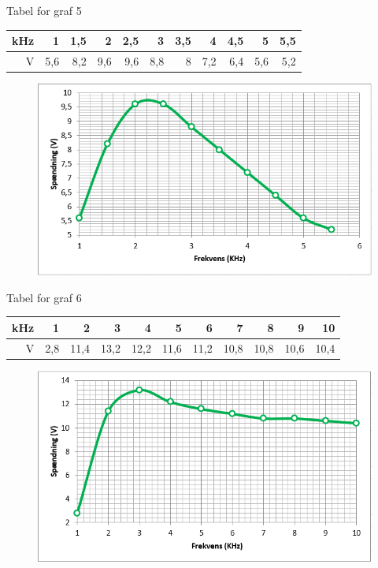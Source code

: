 Tabel for graf 5

\begin{tabular}{|r|r|r|r|r|r|r|r|r|r|r|} \hline
kHz & 1 & 1,5 & 2 & 2,5 & 3 & 3,5 & 4 & 4,5 & 5 & 5,5 \\ \hline
V & 5,6 & 8,2 & 9,6 & 9,6 & 8,8 & 8 & 7,2 & 6,4 & 5,6 & 5,2 \\ \hline
\end{tabular}

\begin{figure}[H]
\includegraphics[scale=1]{Graf5}
\end{figure}

Tabel for graf 6

\begin{tabular}{|r|r|r|r|r|r|r|r|r|r|r|} \hline
kHz & 1 & 2 & 3 & 4 & 5 & 6 & 7 & 8 & 9 & 10 \\ \hline
V & 2,8 & 11,4 & 13,2 & 12,2 & 11,6 & 11,2 & 10,8 & 10,8 & 10,6 & 10,4 \\ \hline
\end{tabular}

\begin{figure}[H]
\includegraphics[scale=1]{Graf6}
\end{figure}

